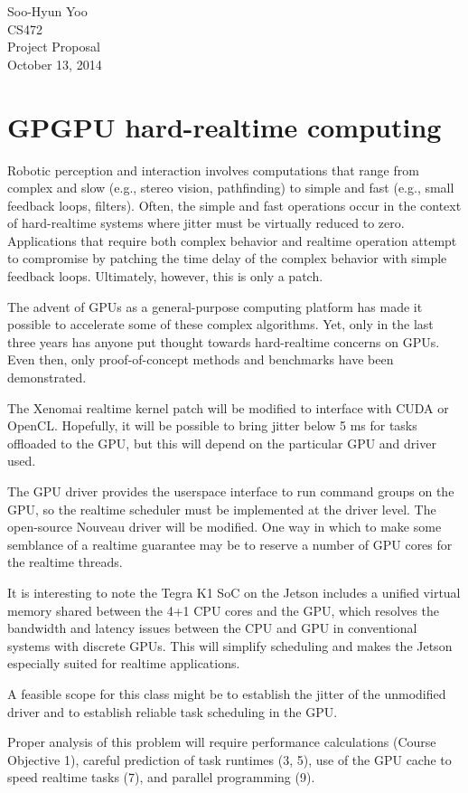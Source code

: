 \documentclass[12pt,letterpaper]{article}
\begin{document}
Soo-Hyun Yoo \\
CS472 \\
Project Proposal \\
October 13, 2014


\section*{GPGPU hard-realtime computing}

Robotic perception and interaction involves computations that range from
complex and slow (e.g., stereo vision, pathfinding) to simple and fast (e.g.,
small feedback loops, filters). Often, the simple and fast operations occur in
the context of hard-realtime systems where jitter must be virtually reduced to
zero. Applications that require both complex behavior and realtime operation
attempt to compromise by patching the time delay of the complex behavior with
simple feedback loops. Ultimately, however, this is only a patch.

The advent of GPUs as a general-purpose computing platform has made it possible
to accelerate some of these complex algorithms. Yet, only in the last three
years has anyone put thought towards hard-realtime concerns on GPUs. Even then,
only proof-of-concept methods and benchmarks have been demonstrated.

The Xenomai realtime kernel patch will be modified to interface with CUDA or
OpenCL. Hopefully, it will be possible to bring jitter below 5 ms for tasks
offloaded to the GPU, but this will depend on the particular GPU and driver
used.

The GPU driver provides the userspace interface to run command groups on the
GPU, so the realtime scheduler must be implemented at the driver level. The
open-source Nouveau driver will be modified. One way in which to make some
semblance of a realtime guarantee may be to reserve a number of GPU cores for
the realtime threads.

It is interesting to note the Tegra K1 SoC on the Jetson includes a unified
virtual memory shared between the 4+1 CPU cores and the GPU, which resolves the
bandwidth and latency issues between the CPU and GPU in conventional systems
with discrete GPUs. This will simplify scheduling and makes the Jetson
especially suited for realtime applications.

A feasible scope for this class might be to establish the jitter of the
unmodified driver and to establish reliable task scheduling in the GPU.

Proper analysis of this problem will require performance calculations (Course
Objective 1), careful prediction of task runtimes (3, 5), use of the GPU cache
to speed realtime tasks (7), and parallel programming (9).
\end{document}
